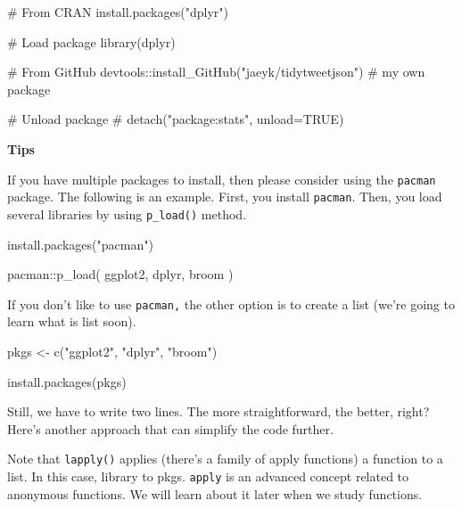 \documentclass[
  letterpaper,
  DIV=11,
  numbers=noendperiod]{scrreprt}
\newenvironment{Shaded}{\begin{snugshade}}{\end{snugshade}}
\newcommand{\CommentTok}[1]{\textcolor[rgb]{0.37,0.37,0.37}{#1}}
\newcommand{\FunctionTok}[1]{\textcolor[rgb]{0.28,0.35,0.67}{#1}}
\newcommand{\NormalTok}[1]{\textcolor[rgb]{0.00,0.23,0.31}{#1}}
\newcommand{\OtherTok}[1]{\textcolor[rgb]{0.00,0.23,0.31}{#1}}
\newcommand{\SpecialCharTok}[1]{\textcolor[rgb]{0.37,0.37,0.37}{#1}}
\newcommand{\StringTok}[1]{\textcolor[rgb]{0.13,0.47,0.30}{#1}}
\begin{document}
\begin{Shaded}
\begin{Highlighting}[]
\CommentTok{\# From CRAN}
\FunctionTok{install.packages}\NormalTok{(}\StringTok{"dplyr"}\NormalTok{) }

\CommentTok{\# Load package }
\FunctionTok{library}\NormalTok{(dplyr)}

\CommentTok{\# From GitHub }
\NormalTok{devtools}\SpecialCharTok{::}\FunctionTok{install\_GitHub}\NormalTok{(}\StringTok{"jaeyk/tidytweetjson"}\NormalTok{) }\CommentTok{\# my own package }

\CommentTok{\# Unload package }
\CommentTok{\# detach("package:stats", unload=TRUE)}
\end{Highlighting}
\end{Shaded}

\textbf{Tips}

If you have multiple packages to install, then please consider using the
\texttt{pacman} package. The following is an example. First, you install
\texttt{pacman}. Then, you load several libraries by using
\texttt{p\_load()} method.

\begin{Shaded}
\begin{Highlighting}[]
\FunctionTok{install.packages}\NormalTok{(}\StringTok{"pacman"}\NormalTok{)}

\NormalTok{pacman}\SpecialCharTok{::}\FunctionTok{p\_load}\NormalTok{(}
\NormalTok{  ggplot2,}
\NormalTok{  dplyr, }
\NormalTok{  broom}
\NormalTok{)}
\end{Highlighting}
\end{Shaded}

If you don't like to use \texttt{pacman,} the other option is to create
a list (we're going to learn what is list soon).

\begin{Shaded}
\begin{Highlighting}[]
\NormalTok{pkgs }\OtherTok{\textless{}{-}} \FunctionTok{c}\NormalTok{(}\StringTok{"ggplot2"}\NormalTok{, }\StringTok{"dplyr"}\NormalTok{, }\StringTok{"broom"}\NormalTok{)}

\FunctionTok{install.packages}\NormalTok{(pkgs)}
\end{Highlighting}
\end{Shaded}

Still, we have to write two lines. The more straightforward, the better,
right? Here's another approach that can simplify the code further.

Note that \texttt{lapply()} applies (there's a family of apply
functions) a function to a list. In this case, library to pkgs.
\texttt{apply} is an advanced concept related to anonymous functions. We
will learn about it later when we study functions.
\end{document}
